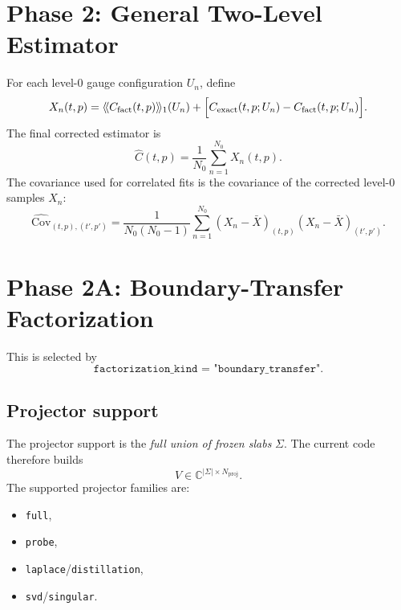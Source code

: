\documentclass[11pt]{article}
\begin{document}
\section{Phase 2: General Two-Level Estimator}
For each level-0 gauge configuration $U_n$, define
\begin{equation}
X_n(t,p)
=
\langle\!\langle C_{\mathrm{fact}}(t,p)\rangle\!\rangle_1(U_n)
+
\Bigl[
C_{\mathrm{exact}}(t,p;U_n) - C_{\mathrm{fact}}(t,p;U_n)
\Bigr].
\end{equation}
The final corrected estimator is
\begin{equation}
\widehat C(t,p) = \frac{1}{N_0}\sum_{n=1}^{N_0} X_n(t,p).
\end{equation}
The covariance used for correlated fits is the covariance of the corrected level-0
samples $X_n$:
\begin{equation}
\widehat{\mathrm{Cov}}_{(t,p),(t',p')}
=
\frac{1}{N_0(N_0-1)}
\sum_{n=1}^{N_0}
\left(X_n-\bar X\right)_{(t,p)}
\left(X_n-\bar X\right)_{(t',p')}.
\end{equation}

\section{Phase 2A: Boundary-Transfer Factorization}
This is selected by
\begin{equation}
\texttt{factorization\_kind = "boundary\_transfer"}.
\end{equation}

\subsection{Projector support}
The projector support is the \emph{full union of frozen slabs} $\Sigma$.
The current code therefore builds
\begin{equation}
V \in \mathbb{C}^{|\Sigma| \times N_{\mathrm{proj}}}.
\end{equation}
The supported projector families are:
\begin{itemize}
  \item \texttt{full},
  \item \texttt{probe},
  \item \texttt{laplace}/\texttt{distillation},
  \item \texttt{svd}/\texttt{singular}.
\end{itemize}
\end{document}
